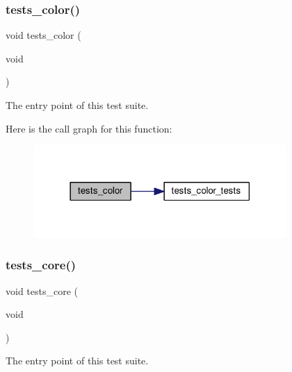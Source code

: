 \subsubsection{\texorpdfstring{tests\+\_\+color()}{tests\_color()}}
{\footnotesize\ttfamily void tests\+\_\+color (\begin{DoxyParamCaption}\item[{void}]{ }\end{DoxyParamCaption})}



The entry point of this test suite. 

Here is the call graph for this function\+:
\nopagebreak
\begin{figure}[H]
\begin{center}
\leavevmode
\includegraphics[width=273pt]{group__unittests_ga211fe87abc68d3c2ef15a3db1dfbcb48_cgraph}
\end{center}
\end{figure}
\mbox{\label{group__unittests_gaaaf35c94f5a45e12f3556bf2be09b022}} 
\subsubsection{\texorpdfstring{tests\+\_\+core()}{tests\_core()}}
{\footnotesize\ttfamily void tests\+\_\+core (\begin{DoxyParamCaption}\item[{void}]{ }\end{DoxyParamCaption})}



The entry point of this test suite. 

